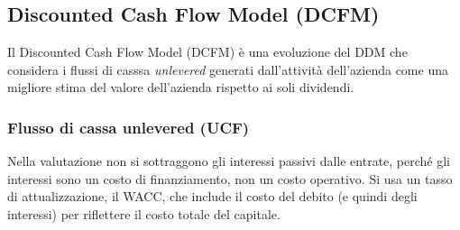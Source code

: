 \documentclass[a4paper,10pt]{article}
\begin{document}
\subsection*{Discounted Cash Flow Model (DCFM)}
Il Discounted Cash Flow Model (DCFM) è una evoluzione del DDM che considera i flussi di casssa \textit{unlevered} generati dall'attività dell'azienda come una migliore stima del valore dell'azienda rispetto ai soli dividendi.
\subsubsection*{Flusso di cassa unlevered (UCF)}
Nella valutazione non si sottraggono gli interessi passivi dalle entrate, perché gli interessi sono un costo di finanziamento, non un costo operativo. 
Si usa un tasso di attualizzazione, il WACC, che include il costo del debito (e quindi degli interessi) per riflettere il costo totale del capitale.
\end{document}
